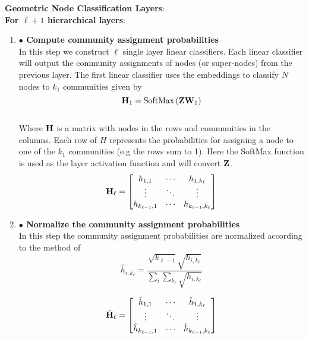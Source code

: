 \documentclass[a4paper,12pt]{article}
\newcommand{\forceindent}{\leavevmode{\parindent=2em\indent}}
\begin{document}
\begin{itemize}
\begin{enumerate}
{\begin{enumerate}
			\end{enumerate}
			\forceindent \textbf{Geometric Node Classification Layers}: \\
			\forceindent \textbf{For $\ell+1$ hierarchical layers}:
			\begin{enumerate}
				\item[]{\textbf{$\bullet$ Compute community assignment probabilities} 
					\\
					In this step we construct $\ell$ single layer linear classifiers. Each linear classifier will output the community assignments of nodes (or super-nodes) from the previous layer. The first linear classifier uses the embeddings to classify $N$ nodes to $k_1$ communities given by
					\[{\bf H}_{1} = \text{SoftMax}\left({\bf Z}{\bf W}_{1}\right) \]
					\\ 
					Where $\bf H$ is a matrix with nodes in the rows and communities in the columns. Each row of $H$ represents the probabilities for assigning a node to one of the $k_1$ communities (e.g the rows sum to 1). Here the SoftMax function is used as the layer activation function and will convert ${\bf Z}$. 
					\[{\bf H}_\ell = \begin{bmatrix}
						h_{1, 1} & \cdots & h_{1, k_\ell} \\
						\vdots  & \ddots & \vdots \\
						h_{k_{\ell - 1}, 1} & \cdots & h_{k_{\ell -1}, k_\ell} 
					\end{bmatrix}\]}
				
				\item[]{\textbf{$\bullet$ Normalize the community assignment probabilities}
					\\
					In this step the community assignment probabilities are normalized according to the method of %
					\[ \hat{h}_{i,k_\ell} = \frac{\sqrt{k_{\ell-1}} \sqrt{h_{i, k_\ell}}}{\sum_i \sum_{k_\ell} \sqrt{h_{i, k_\ell}}}\]
					
					\[\hat{\bf H}_\ell = \begin{bmatrix}
						\hat{h}_{1, 1} & \cdots & \hat{h}_{1, k_\ell} \\
						\vdots  & \ddots & \vdots \\
						\hat{h}_{k_{\ell - 1}, 1} & \cdots & \hat{h}_{k_{\ell -1}, k_\ell} 
					\end{bmatrix}\]
				}
				

\end{enumerate}}
\end{enumerate}
\end{itemize}
\end{document}
